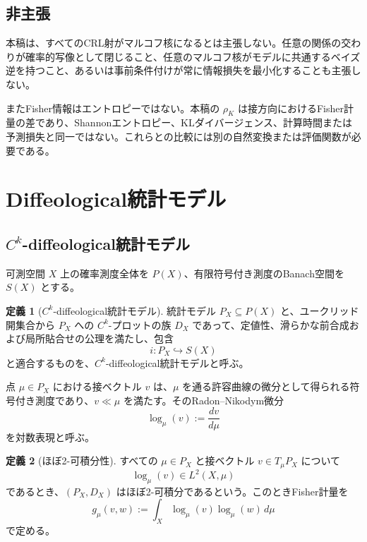 \documentclass[a4paper,11pt]{ltjsarticle}
\theoremstyle{definition}
\newtheorem{definition}{定義}[section]
\theoremstyle{plain}
\begin{document}
\subsection{非主張}

本稿は、すべてのCRL射がマルコフ核になるとは主張しない。任意の関係の交わりが確率的写像として閉じること、任意のマルコフ核がモデルに共通するベイズ逆を持つこと、あるいは事前条件付けが常に情報損失を最小化することも主張しない。

またFisher情報はエントロピーではない。本稿の $\rho_K$ は接方向におけるFisher計量の差であり、Shannonエントロピー、KLダイバージェンス、計算時間または予測損失と同一ではない。これらとの比較には別の自然変換または評価関数が必要である。

\section{Diffeological統計モデル}

\subsection{\texorpdfstring{$C^k$}{Ck}-diffeological統計モデル}

可測空間 $X$ 上の確率測度全体を $P(X)$、有限符号付き測度のBanach空間を $S(X)$ とする。

\begin{definition}[$C^k$-diffeological統計モデル]
統計モデル $P_X\subseteq P(X)$ と、ユークリッド開集合から $P_X$ への $C^k$-プロットの族 $D_X$ であって、定値性、滑らかな前合成および局所貼合せの公理を満たし、包含
\begin{equation}
 i:P_X\hookrightarrow S(X)
\end{equation}
と適合するものを、$C^k$-diffeological統計モデルと呼ぶ\cite{Le2020DiffeologicalStatistics,IglesiasZemmour2013}。
\end{definition}

点 $\mu\in P_X$ における接ベクトル $v$ は、$\mu$ を通る許容曲線の微分として得られる符号付き測度であり、$v\ll\mu$ を満たす。そのRadon--Nikodym微分
\begin{equation}
 \log_\mu(v):=\frac{dv}{d\mu}
 \end{equation}
を対数表現と呼ぶ。

\begin{definition}[ほぼ2-可積分性]
すべての $\mu\in P_X$ と接ベクトル $v\in T_\mu P_X$ について
\begin{equation}
 \log_\mu(v)\in L^2(X,\mu)
\end{equation}
であるとき、$(P_X,D_X)$ はほぼ2-可積分であるという。このときFisher計量を
\begin{equation}
 g_\mu(v,w)
 :=
 \int_X
 \log_\mu(v)\log_\mu(w)\,d\mu
 \label{eq:fisher-metric}
\end{equation}
で定める。
\end{definition}
\end{document}
